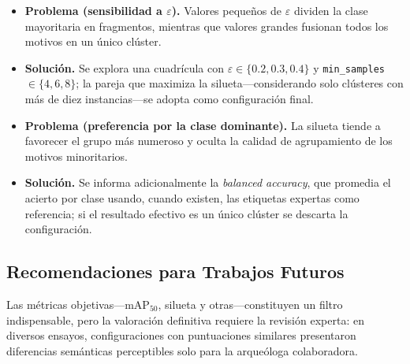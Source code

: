 \begin{itemize}
  \item \textbf{Problema (sensibilidad a \(\varepsilon\)).}
        Valores pequeños de \(\varepsilon\) dividen la clase mayoritaria en fragmentos, mientras que valores grandes fusionan todos los motivos en un único clúster.
  \item \textbf{Solución.}
        Se explora una cuadrícula con \(\varepsilon\in\{0.2,0.3,0.4\}\) y \texttt{min\_samples}\(\in\{4,6,8\}\); la pareja que maximiza la silueta—considerando solo clústeres con más de diez instancias—se adopta como configuración final.

  \item \textbf{Problema (preferencia por la clase dominante).}
        La silueta tiende a favorecer el grupo más numeroso y oculta la calidad de agrupamiento de los motivos minoritarios.
  \item \textbf{Solución.}
        Se informa adicionalmente la \emph{balanced accuracy}, que promedia el acierto por clase usando, cuando existen, las etiquetas expertas como referencia; si el resultado efectivo es un único clúster se descarta la configuración.
\end{itemize}

\subsection{Recomendaciones para Trabajos Futuros}

Las métricas objetivas—\(\text{mAP}_{50}\), silueta y otras—constituyen un filtro indispensable, pero la valoración definitiva requiere la revisión experta: en diversos ensayos, configuraciones con puntuaciones similares presentaron diferencias semánticas perceptibles solo para la arqueóloga colaboradora.

